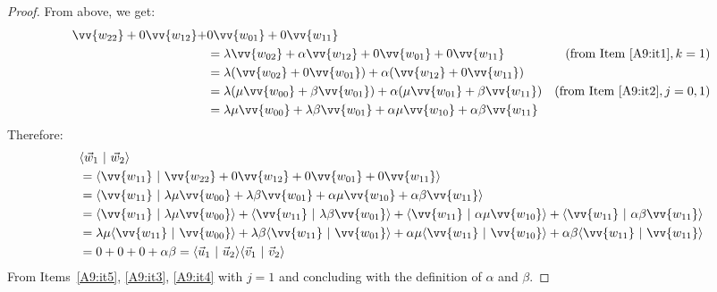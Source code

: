 \documentclass[a4paper,UKenglish,numberwithinsect,pdfa,anonymous]{lipics-v2021}
\theoremstyle{restatestyle}
\def\scal#1#2{\langle{#1}~|~{#2}\rangle}
\begin{document}
\begin{lemma}
\begin{proof}
    From above, we get:
    \begin{align*}
        \vv{w_{22}} + 0\vv{w_{12}} + &0\vv{w_{01}} + 0\vv{w_{11}} \\
        &= \lambda\vv{w_{02}} + \alpha\vv{w_{12}} + 0\vv{w_{01}} + 0\vv{w_{11}} & (\text{from Item~\ref{A9:it1}}, k =1)\\
        &= \lambda(\vv{w_{02}}+0\vv{w_{01}}) + \alpha(\vv{w_{12}}+0\vv{w_{11}})&\\
        &= \lambda(\mu\vv{w_{00}} + \beta\vv{w_{01}}) + \alpha(\mu\vv{w_{01}}+\beta\vv{w_{11}}) & (\text{from Item~\ref{A9:it2}}, j=0,1)\\
        &= \lambda\mu\vv{w_{00}} + \lambda\beta\vv{w_{01}} + \alpha\mu\vv{w_{10}} + \alpha\beta\vv{w_{11}}
    \end{align*}
    Therefore:
    \begin{align*}
        &\scal{\vec{w}_{1}}{\vec{w}_{2}} \\
        &= \scal{\vv{w_{11}}}{\vv{w_{22}} + 0 \vv{w_{12}} + 0 \vv{w_{01}} + 0 \vv{w_{11}}}\\
        &= \scal{\vv{w_{11}}}{\lambda\mu\vv{w_{00}} + \lambda\beta\vv{w_{01}} + \alpha\mu\vv{w_{10}} + \alpha\beta\vv{w_{11}}}\\
        &=\scal{\vv{w_{11}}}{\lambda\mu\vv{w_{00}}} + \scal{\vv{w_{11}}}{\lambda\beta\vv{w_{01}}} + \scal{\vv{w_{11}}}{\alpha\mu\vv{w_{10}}} + \scal{\vv{w_{11}}}{\alpha\beta\vv{w_{11}}}\\
        &=\lambda\mu\scal{\vv{w_{11}}}{\vv{w_{00}}} + \lambda\beta\scal{\vv{w_{11}}}{\vv{w_{01}}} + \alpha\mu\scal{\vv{w_{11}}}{\vv{w_{10}}} + \alpha\beta\scal{\vv{w_{11}}}{\vv{w_{11}}}\\
        &= 0 + 0 + 0 + \alpha\beta = \scal{\vec{u}_{1}}{\vec{u}_{2}}\scal{\vec{v}_{1}}{\vec{v}_{2}}
    \end{align*}
  From Items~\ref{A9:it5}, \ref{A9:it3}, \ref{A9:it4} with $j=1$ and concluding with the definition of $\alpha$ and $\beta$.
\end{proof}
\end{lemma}
\end{document}
